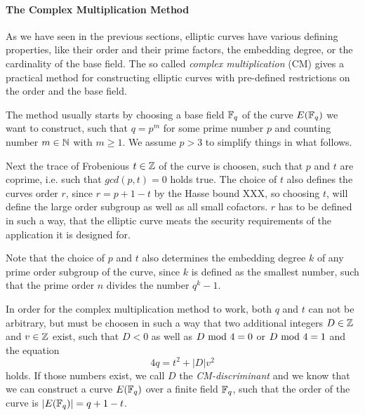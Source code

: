\paragraph{The Complex Multiplication Method}
As we have seen in the previous sections, elliptic curves have various defining properties, like their order and their prime factors, the embedding degree, or the cardinality of the base field. The so called \textit{complex multiplication} (CM) gives a practical method for constructing elliptic curves with pre-defined restrictions on the order and the base field.


The method usually starts by choosing a base field $\mathbb{F}_{q}$ of the curve $E(\mathbb{F}_q)$ we want to construct, such that $q = p^m$ for some prime number $p$ and counting number $m\in \mathbb{N}$ with $m\geq 1$. We assume $p>3$ to simplify things in what follows.

Next the trace of Frobenious $t\in \mathbb{Z}$ of the curve is choosen, such that $p$ and $t$ are coprime, i.e. such that $gcd(p,t)=0$ holds true. The choice of $t$ also defines the curves order $r$, since $r=p+1-t$ by the Hasse bound XXX, so choosing $t$, will define the large order subgroup as well as all small cofactors. $r$ has to be defined in such a way, that the elliptic curve meats the security requirements of the application it is designed for.

Note that the choice of $p$ and $t$ also determines the embedding degree $k$ of any prime order subgroup of the curve, since $k$ is defined as the smallest number, such that the prime order $n$ divides the number $q^k-1$.

In order for the complex multiplication method to work, both $q$ and $t$ can not be arbitrary, but must be choosen in such a way that two additional integers $D\in \mathbb{Z}$ and $v\in \mathbb{Z}$ exist, such that $D<0$ as well as $D \text{ mod } 4=0$ or $D \text{ mod } 4=1$ and the equation
\begin{equation}
     4q  = t^2 + |D|v^2
\end{equation}
holds. If those numbers exist, we call $D$ the \textit{CM-discriminant} and we know that we can construct a curve $E(\mathbb{F}_q)$ over a finite field $\mathbb{F}_q$, such that the order of the curve is $|E(\mathbb{F}_q)|= q+1-t$.


